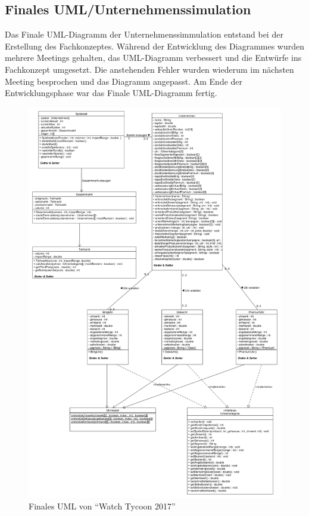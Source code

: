 \subsection{Finales UML/Unternehmenssimulation}
Das Finale UML-Diagramm der Unternehmenssimmulation entstand bei der Erstellung des Fachkonzeptes. Während der Entwicklung des Diagrammes wurden mehrere Meetings gehalten, das UML-Diagramm verbessert und die Entwürfe ins Fachkonzept umgesetzt. Die anstehenden Fehler wurden wiederum im nächsten Meeting besprochen und das Diagramm angepasst. Am Ende der Entwicklungsphase war das Finale UML-Diagramm fertig.
\begin{figure} [!h]
	\centering
	\includegraphics[scale=0.3]{img/Unternehmenssimmulation_final.png} 
	\caption{Finales UML von \enquote{Watch Tycoon 2017}} \label{fig:abb27}
\end{figure}

